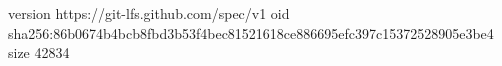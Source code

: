 version https://git-lfs.github.com/spec/v1
oid sha256:86b0674b4bcb8fbd3b53f4bec81521618ce886695efc397c15372528905e3be4
size 42834
